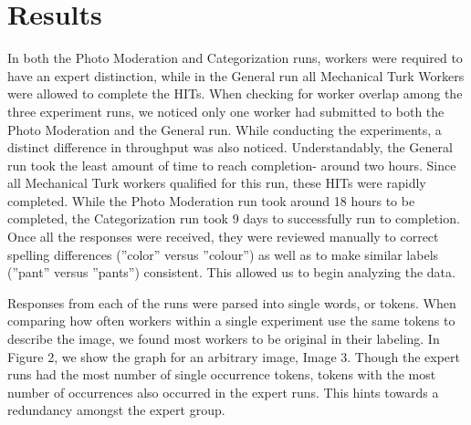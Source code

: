 \documentclass{chi2012}
\newcommand{\tab}{\hspace*{2em}}
\begin{document}

\section{Results}
\tab In both the Photo Moderation and Categorization runs, workers were required to have an expert distinction, while in the General run all Mechanical Turk Workers were allowed to complete the HITs. When checking for worker overlap among the three experiment runs, we noticed only one worker had submitted to both the Photo Moderation and the General run. While conducting the experiments, a distinct difference in throughput was also noticed. Understandably, the General run took the least amount of time to reach completion- around two hours. Since all Mechanical Turk workers qualified for this run, these HITs were rapidly completed. While the Photo Moderation run took around 18 hours to be completed, the Categorization run took 9 days to successfully run to completion. Once all the responses were received, they were reviewed manually to correct spelling differences (''color'' versus ''colour'') as well as to make similar labels (''pant'' versus ''pants'') consistent. This allowed us to begin analyzing the data.

\tab Responses from each of the runs were parsed into single words, or tokens. When comparing how often workers within a single experiment use the same tokens to describe the image, we found most workers to be original in their labeling. In Figure 2, we show the graph for an arbitrary image, Image 3. Though the expert runs had the most number of single occurrence tokens, tokens with the most number of occurrences also occurred in the expert runs. This hints towards a redundancy amongst the expert group.
 
\end{document}
